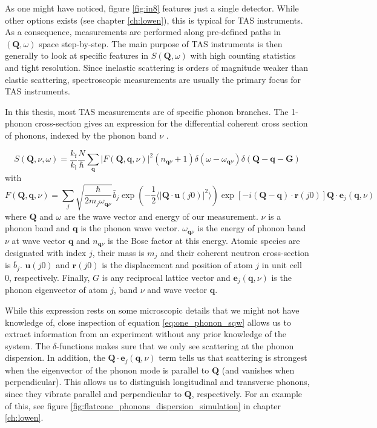 As one might have noticed, figure \ref{fig:in8} features just a single detector. While other options exists (see chapter \ref{ch:lowen}), this is typical for TAS instruments. As a consequence, measurements are performed along pre-defined paths in $(\bm{Q}, \omega)$ space step-by-step. The main purpose of TAS instruments is then generally to look at specific features in $S(\bm{Q},\omega)$ with high counting statistics and tight resolution. Since inelastic scattering is orders of magnitude weaker than elastic scattering, spectroscopic measurements are usually the primary focus for TAS instruments.

In this thesis, most TAS measurements are of specific phonon branches. The 1-phonon cross-section gives an expression for the differential coherent cross section of phonons, indexed by the phonon band $\nu$ \cite{Squires2012}.

\begin{equation}
	S(\bm{Q},\nu,\omega) = \frac{k_\text{f}}{k_\text{i}} \frac{N}{\hbar} \sum_{\bm{q}} | F(\bm{Q},\bm{q},\nu) |^2 ( n_{\bm{q}\nu} + 1) \delta (\omega - \omega_{\bm{q}\nu}) \delta(\bm{Q} - \bm{q} - \bm{G})
	\label{eq:one_phonon_sqw}
\end{equation}
%
with
%
\[
	F(\bm{Q}, \bm{q}, \nu) = \sum_j \sqrt{\frac{\hbar}{2 m_j \omega_{\bm{q}\nu}}} \bar{b}_j \exp \left( -\frac{1}{2} \langle | \bm{Q} \cdot \bm{u}(j0) |^2 \rangle \right) \exp [ -i(\bm{Q} - \bm{q}) \cdot \bm{r}(j0) ] \bm{Q} \cdot \bm{e}_j(\bm{q},\nu)
\]
%
where $\bm{Q}$ and $\omega$ are the wave vector and energy of our measurement. $\nu$ is a phonon band and $\bm{q}$ is the phonon wave vector. $\omega_{\bm{q}\nu}$ is the energy of phonon band $\nu$ at wave vector $\bm{q}$ and $n_{\bm{q}\nu}$ is the Bose factor at this energy. Atomic species are designated with index $j$, their mass is $m_j$ and their coherent neutron cross-section is $\bar{b}_j$. $\bm{u}(j0)$ and $\bm{r}(j0)$ is the displacement and position of atom $j$ in unit cell 0, respectively. Finally, $G$ is any reciprocal lattice vector and $\bm{e}_j(\bm{q},\nu)$ is the phonon eigenvector of atom $j$, band $\nu$ and wave vector $\bm{q}$.

While this expression rests on some microscopic details that we might not have knowledge of, close inspection of equation \eqref{eq:one_phonon_sqw} allows us to extract information from an experiment without any prior knowledge of the system. The $\delta$-functions makes sure that we only see scattering at the phonon dispersion. In addition, the $\bm{Q}\cdot \bm{e}_j(\bm{q},\nu)$ term tells us that scattering is strongest when the eigenvector of the phonon mode is parallel to $\bm{Q}$ (and vanishes when perpendicular). This allows us to distinguish longitudinal and transverse phonons, since they vibrate parallel and perpendicular to $\bm{Q}$, respectively. For an example of this, see figure \ref{fig:flatcone_phonons_dispersion_simulation} in chapter \ref{ch:lowen}.

